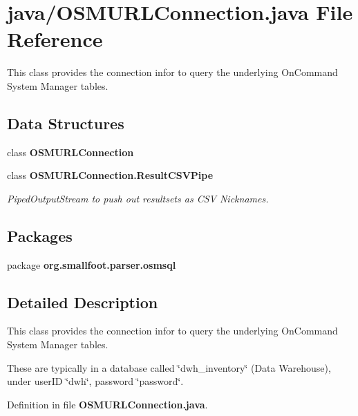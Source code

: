 \section{java/\+O\+S\+M\+U\+R\+L\+Connection.java File Reference}
\label{OSMURLConnection_8java}


This class provides the connection infor to query the underlying On\+Command System Manager tables.  


\subsection*{Data Structures}
\begin{DoxyCompactItemize}
\item 
class {\bf O\+S\+M\+U\+R\+L\+Connection}
\item 
class {\bf O\+S\+M\+U\+R\+L\+Connection.\+Result\+C\+S\+V\+Pipe}
\begin{DoxyCompactList}\small\item\em Piped\+Output\+Stream to push out resultsets as C\+S\+V Nicknames. \end{DoxyCompactList}\end{DoxyCompactItemize}
\subsection*{Packages}
\begin{DoxyCompactItemize}
\item 
package {\bf org.\+smallfoot.\+parser.\+osmsql}
\end{DoxyCompactItemize}


\subsection{Detailed Description}
This class provides the connection infor to query the underlying On\+Command System Manager tables. 

These are typically in a database called \char`\"{}dwh\+\_\+inventory\char`\"{} (Data Warehouse), under user\+I\+D \char`\"{}dwh\char`\"{}, password \char`\"{}password\char`\"{}. 

Definition in file {\bf O\+S\+M\+U\+R\+L\+Connection.\+java}.

